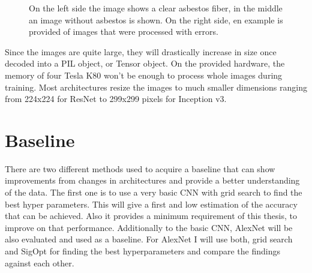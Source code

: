 \begin{figure}[t]
\centering
{}
\caption{On the left side the image shows a clear asbestos fiber, in the middle an image without asbestos is shown. On the right side, en example is provided of images that were processed with errors.}
\label{fig:basic_examples}
\end{figure}

\newpage

Since the images are quite large, they will drastically increase in size once decoded into a PIL object, or Tensor object. On the provided hardware, the memory of four Tesla K80 won't be enough to process whole images during training. Most architectures resize the images to much smaller dimensions ranging from 224x224 for ResNet to 299x299 pixels for Inception v3.

\section{Baseline}

There are two different methods used to acquire a baseline that can show improvements from changes in architectures and provide a better understanding of the data. The first one is to use a very basic CNN with grid search to find the best hyper parameters. This will give a first and low estimation of the accuracy that can be achieved. Also it provides a minimum requirement of this thesis, to improve on that performance. Additionally to the basic CNN, AlexNet will be also evaluated and used as a baseline. For AlexNet I will use both, grid search and SigOpt for finding the best hyperparameters and compare the findings against each other.\\

